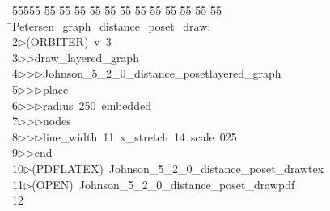 %
%
\begin{tabbing}
55555 \= 55 \= 55 \= 55 \= 55 \= 55 \= 55 \= 55 \= 55 \= 55 \= 55 \= 55 \= 55 \= \>Petersen\_graph\_distance\_poset\_draw:\\[0pt]
2\>$\triangleright$\>(ORBITER)\ v\ 3\ \\[0pt]
3\>$\triangleright$\>$\triangleright$\>draw\_layered\_graph\ \\[0pt]
4\>$\triangleright$\>$\triangleright$\>$\triangleright$\>Johnson\_5\_2\_0\_distance\_posetlayered\_graph\ \\[0pt]
5\>$\triangleright$\>$\triangleright$\>$\triangleright$\>place\ \\[0pt]
6\>$\triangleright$\>$\triangleright$\>$\triangleright$\>radius\ 250\ embedded\ \\[0pt]
7\>$\triangleright$\>$\triangleright$\>$\triangleright$\>nodes\ \\[0pt]
8\>$\triangleright$\>$\triangleright$\>$\triangleright$\>line\_width\ 11\ x\_stretch\ 14\ scale\ 025\ \\[0pt]
9\>$\triangleright$\>$\triangleright$\>end\\[0pt]
10\>$\triangleright$\>(PDFLATEX)\ Johnson\_5\_2\_0\_distance\_poset\_drawtex\\[0pt]
11\>$\triangleright$\>(OPEN)\ Johnson\_5\_2\_0\_distance\_poset\_drawpdf\\[0pt]
12\>\end{tabbing}
